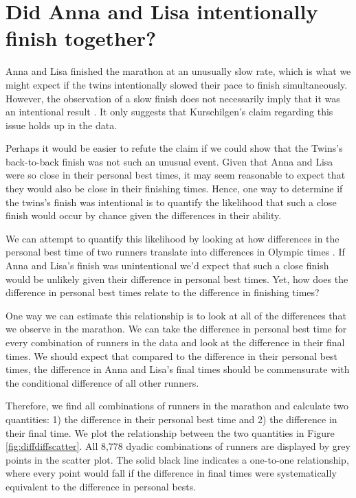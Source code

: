 \documentclass[12pt,titlepage]{article}
\begin{document}
\section*{Did Anna and Lisa intentionally finish together?}

Anna and Lisa finished the marathon at an unusually slow rate, which is what we might expect if the twins intentionally slowed their pace to finish simultaneously.  However, the observation of a slow finish does not necessarily imply that it was an intentional result .  It only suggests that Kurschilgen's claim regarding this issue holds up in the data.

Perhaps it would be easier to refute the claim if we could show that the Twins's back-to-back finish was not such an unusual event.  Given that Anna and Lisa were so close in their personal best times, it may seem reasonable to expect that they would also be close in their finishing times.   Hence, one way to determine if the twins's finish was intentional is to quantify the likelihood that such a close finish would occur by chance given the differences in their ability. 

We can attempt to quantify this likelihood by looking at how differences in the personal best time of two runners translate into differences in Olympic times .  If Anna and Lisa's finish was unintentional we'd expect that such a close finish would be unlikely given their difference in personal best times.   Yet, how does the difference in personal best times relate to the difference in finishing times?

One way we can estimate this relationship is to look at all of the differences that we observe in the marathon.  We can take the difference in personal best time for every combination of runners in the data and look at the difference in their final times.  We should expect that compared to the difference in their personal best times, the difference in Anna and Lisa's final times should be commensurate with the conditional difference of all other runners. %

Therefore, we find all combinations of runners in the marathon and calculate two quantities: 1) the difference in their personal best time and 2) the difference in their final time. We plot the relationship between the two quantities in Figure \ref{fig:diffdiffscatter}.   All 8,778 dyadic combinations of runners are displayed by grey points in the scatter plot.   The solid black line indicates a one-to-one relationship, where every point would fall if the difference in final times were systematically equivalent to the difference in personal bests.  
\end{document}
